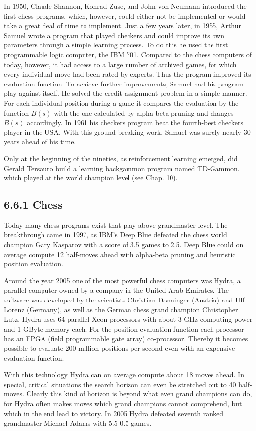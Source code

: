 \documentclass[10pt]{book}
\begin{document}
\begin{center}
\begin{enumerate}
In 1950, Claude Shannon, Konrad Zuse, and John von Neumann introduced the first chess programs, which, however, could either not be implemented or would take a great deal of time to implement. Just a few years later, in 1955, Arthur Samuel wrote a program that played checkers and could improve its own parameters through a simple learning process. To do this he used the first programmable logic computer, the IBM 701. Compared to the chess computers of today, however, it had access to a large number of archived games, for which every individual move had been rated by experts. Thus the program improved its evaluation function. To achieve further improvements, Samuel had his program play against itself. He solved the credit assignment problem in a simple manner. For each individual position during a game it compares the evaluation by the function $B(s)$ with the one calculated by alpha-beta pruning and changes $B(s)$ accordingly. In 1961 his checkers program beat the fourth-best checkers player in the USA. With this ground-breaking work, Samuel was surely nearly 30 years ahead of his time.

Only at the beginning of the nineties, as reinforcement learning emerged, did Gerald Tersauro build a learning backgammon program named TD-Gammon, which played at the world champion level (see Chap. 10).

\subsection*{6.6.1 Chess}
Today many chess programs exist that play above grandmaster level. The breakthrough came in 1997, as IBM's Deep Blue defeated the chess world champion Gary Kasparov with a score of 3.5 games to 2.5. Deep Blue could on average compute 12 half-moves ahead with alpha-beta pruning and heuristic position evaluation.

Around the year 2005 one of the most powerful chess computers was Hydra, a parallel computer owned by a company in the United Arab Emirates. The software was developed by the scientists Christian Donninger (Austria) and Ulf Lorenz (Germany), as well as the German chess grand champion Christopher Lutz. Hydra uses 64 parallel Xeon processors with about 3 GHz computing power and 1 GByte memory each. For the position evaluation function each processor has an FPGA (field programmable gate array) co-processor. Thereby it becomes possible to evaluate 200 million positions per second even with an expensive evaluation function.

With this technology Hydra can on average compute about 18 moves ahead. In special, critical situations the search horizon can even be stretched out to 40 half-moves. Clearly this kind of horizon is beyond what even grand champions can do, for Hydra often makes moves which grand champions cannot comprehend, but which in the end lead to victory. In 2005 Hydra defeated seventh ranked grandmaster Michael Adams with 5.5-0.5 games.


\end{enumerate}
\end{center}
\end{document}
